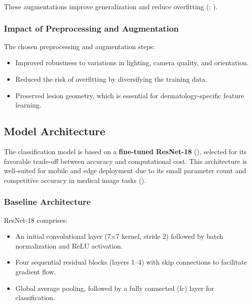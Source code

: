 \documentclass[
  12pt,
  oneside]{article}
\providecommand{\tightlist}{%
  \setlength{\itemsep}{0pt}\setlength{\parskip}{0pt}}
\begin{document}
These augmentations improve generalization and reduce overfitting
(;
).

\subsubsection{Impact of Preprocessing and
Augmentation}\label{impact-of-preprocessing-and-augmentation}

The chosen preprocessing and augmentation steps:

\begin{itemize}
\tightlist
\item
  Improved robustness to variations in lighting, camera quality, and
  orientation.
\item
  Reduced the risk of overfitting by diversifying the training data.
\item
  Preserved lesion geometry, which is essential for dermatology-specific
  feature learning.
\end{itemize}

\subsection{Model Architecture}\label{model-architecture}

The classification model is based on a \textbf{fine-tuned ResNet-18}
(), selected for its favorable
trade-off between accuracy and computational cost. This architecture is
well-suited for mobile and edge deployment due to its small parameter
count and competitive accuracy in medical image tasks
().

\subsubsection{Baseline Architecture}\label{baseline-architecture}

ResNet-18 comprises:

\begin{itemize}
\tightlist
\item
  An initial convolutional layer (7×7 kernel, stride 2) followed by
  batch normalization and ReLU activation.
\item
  Four sequential residual blocks (layers 1--4) with skip connections to
  facilitate gradient flow.
\item
  Global average pooling, followed by a fully connected (fc) layer for
  classification.
\end{itemize}
\end{document}
